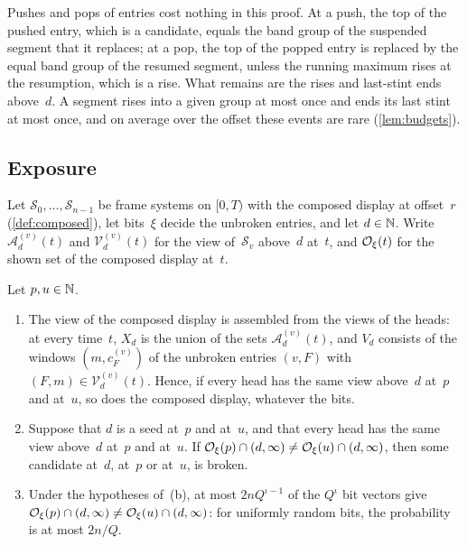 Pushes and pops of entries cost nothing in this proof. At a push, the top of the pushed entry, which is a candidate, equals the band
group of the suspended segment that it replaces; at a pop, the top of the popped entry is replaced by the equal band group of the
resumed segment, unless the running maximum rises at the resumption, which is a rise. What remains are the rises and last-stint
ends above~$d$. A segment rises into a given group at most once and ends its last stint at most once, and on average over the
offset these events are rare (\cref{lem:budgets}).

\subsection{Exposure}\label{sec:displays-exposure}

Let $\mathcal S_0,\dots,\mathcal S_{n-1}$ be frame systems on $[0,T)$ with the composed display at offset~$r$ (\cref{def:composed}), let bits~$\xi$
decide the unbroken entries, and let $d\in\mathbb{N}$. Write $\mathcal A^{(v)}_d(t)$ and $\mathcal V^{(v)}_d(t)$ for the view of~$\mathcal S_v$
above~$d$ at~$t$, and $\mathcal{O}_\xi(t)$ for the shown set of the composed display at~$t$.

\begin{proposition}[Exposure]\label{prop:exposure}
Let $p,u\in\mathbb{N}$.
\begin{enumerate}[label=(\alph*)]
\item The view of the composed display is assembled from the views of the heads: at every time~$t$, $X_d$ is the union of the
sets $\mathcal A^{(v)}_d(t)$, and $V_d$ consists of the windows $(m,c^{(v)}_F)$ of the unbroken entries $(v,F)$ with
$(F,m)\in\mathcal V^{(v)}_d(t)$. Hence, if every head has the same view above~$d$ at~$p$ and at~$u$, so does the composed display,
whatever the bits.
\item Suppose that $d$ is a seed at~$p$ and at~$u$, and that every head has the same view above~$d$ at~$p$ and at~$u$. If
$\mathcal{O}_\xi(p)\cap(d,\infty)\ne\mathcal{O}_\xi(u)\cap(d,\infty)$, then some candidate at~$d$, at~$p$ or at~$u$, is broken.
\item Under the hypotheses of~(b), at most $2nQ^{\iota-1}$ of the $Q^\iota$ bit vectors give
$\mathcal{O}_\xi(p)\cap(d,\infty)\ne\mathcal{O}_\xi(u)\cap(d,\infty)$: for uniformly random bits, the probability is at most $2n/Q$.
\end{enumerate}
\end{proposition}

